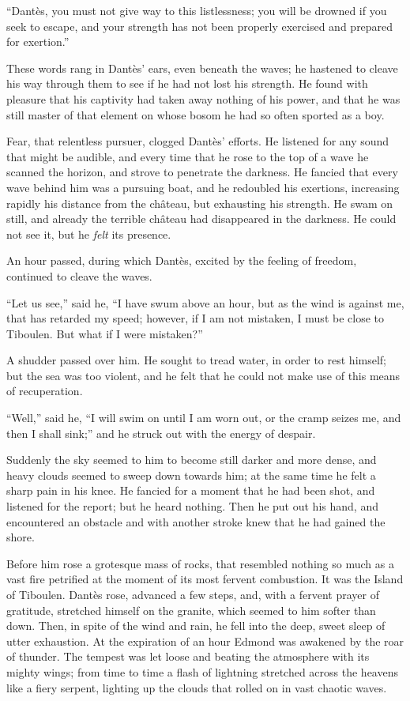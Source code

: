 “Dantès, you must not give way to this listlessness; you will be
drowned if you seek to escape, and your strength has not been properly
exercised and prepared for exertion.”

These words rang in Dantès’ ears, even beneath the waves; he hastened
to cleave his way through them to see if he had not lost his strength.
He found with pleasure that his captivity had taken away nothing of his
power, and that he was still master of that element on whose bosom he
had so often sported as a boy.

Fear, that relentless pursuer, clogged Dantès’ efforts. He listened for
any sound that might be audible, and every time that he rose to the top
of a wave he scanned the horizon, and strove to penetrate the darkness.
He fancied that every wave behind him was a pursuing boat, and he
redoubled his exertions, increasing rapidly his distance from the
château, but exhausting his strength. He swam on still, and already the
terrible château had disappeared in the darkness. He could not see it,
but he \textit{felt} its presence.

An hour passed, during which Dantès, excited by the feeling of freedom,
continued to cleave the waves.

“Let us see,” said he, “I have swum above an hour, but as the wind is
against me, that has retarded my speed; however, if I am not mistaken,
I must be close to Tiboulen. But what if I were mistaken?”

A shudder passed over him. He sought to tread water, in order to rest
himself; but the sea was too violent, and he felt that he could not
make use of this means of recuperation.

“Well,” said he, “I will swim on until I am worn out, or the cramp
seizes me, and then I shall sink;” and he struck out with the energy of
despair.

Suddenly the sky seemed to him to become still darker and more dense,
and heavy clouds seemed to sweep down towards him; at the same time he
felt a sharp pain in his knee. He fancied for a moment that he had been
shot, and listened for the report; but he heard nothing. Then he put
out his hand, and encountered an obstacle and with another stroke knew
that he had gained the shore.

Before him rose a grotesque mass of rocks, that resembled nothing so
much as a vast fire petrified at the moment of its most fervent
combustion. It was the Island of Tiboulen. Dantès rose, advanced a few
steps, and, with a fervent prayer of gratitude, stretched himself on
the granite, which seemed to him softer than down. Then, in spite of
the wind and rain, he fell into the deep, sweet sleep of utter
exhaustion. At the expiration of an hour Edmond was awakened by the
roar of thunder. The tempest was let loose and beating the atmosphere
with its mighty wings; from time to time a flash of lightning stretched
across the heavens like a fiery serpent, lighting up the clouds that
rolled on in vast chaotic waves.

